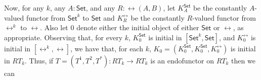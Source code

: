 \documentclass{lmcs}
\theoremstyle{plain}\newtheorem{satz}[thm]{Satz}
\newcommand{\cal}{\mathcal}
\newcommand{\set}{\mathsf{Set}}
\begin{document}
{%
\begin{comment}
\begin{defi}\label{def:omega-cocont}
An endofunctor $T = (T^1,T^2,T^*)$ on $RT_k$ is {\em
$\omega$-cocontinuous} if $T^1$ and $T^2$ are $\omega$-cocontinuous
endofunctors on $[\set^k,\set]$ and $T^*$ is an $\omega$-cocontinuous
functor from $RT_k$ to $[\rel^k,\rel]$, i.e., is in
$[RT_k,[\rel^k,\rel]]$.
\end{defi}
\end{comment}
Now, for any $k$, any $A : \set$, and any $R : \rel(A, B)$, let
$K^\set_A$ be the constantly $A$-valued functor from $\set^k$ to
$\set$ and $K^\rel_R$ be the constantly $R$-valued functor from
$\rel^k$ to $\rel$.  Also let $0$ denote either the initial object of
either $\set$ or $\rel$, as appropriate.  Observing that, for every
$k$, $K^\set_0$ is initial in $[\set^k,\set]$, and $K^\rel_0$ is
initial in $[\rel^k,\rel]$, we have that, for each $k$, $K_0 =
(K^\set_0,K^\set_0,K^\rel_0)$ is initial in $RT_k$. Thus, if $T =
(T^1,T^2,T^*) : RT_k \to RT_k$ is an endofunctor on $RT_k$ then we can
}
\end{document}
